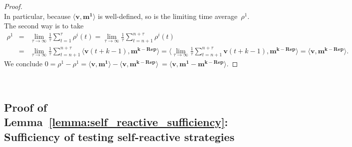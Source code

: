 \documentclass[9pt,twoside,lineno]{pnas-new}
\theoremstyle{plainCl1}
\theoremstyle{plainCl2}
\begin{document}
\begin{proof}
\begin{equation*}
\end{equation*}
In particular, because $\big\langle \mathbf{v},\mathbf{m^1} \big\rangle$ is well-defined, so is the limiting time average~$\rho^1$. The second way is to take
\begin{equation*}
\begin{array}{rcl}
\rho^1 &= &\displaystyle 
\lim_{\tau \to \infty} \frac{1}{\tau} \sum_{t=1}^\tau \rho^i(t) 
= \lim_{\tau \to \infty} \frac{1}{\tau} \sum_{t=n+1}^{n+\tau} \rho^i(t)\\[0.5cm]
&= &\displaystyle 
\lim_{\tau \to \infty} \frac{1}{\tau} \sum_{t=n+1}^{n+\tau}  \big\langle \mathbf{v}(t\!+\!k\!-\!1) ,  \mathbf{m^{k-\text{Rep}}}\big\rangle 
=  \big\langle  \lim_{\tau \to \infty} \frac{1}{\tau} \sum_{t=n+1}^{n+\tau} \mathbf{v}(t\!+\!k\!-\!1) ,  \mathbf{m^{k-\text{Rep}}}\big\rangle
= \big\langle \mathbf{v},  \mathbf{m^{k-\text{Rep}}} \big\rangle.
\end{array}
\end{equation*}
We conclude
$
0 = \rho^1 \!-\! \rho^1 = \big\langle \mathbf{v},\mathbf{m^1} \big\rangle\!-\!\big\langle \mathbf{v},  \mathbf{m^{k-\text{Rep}}} \big\rangle\ = \big\langle \mathbf{v}, \mathbf{m^1}\!-\!\mathbf{m^{k-\text{Rep}}} \big\rangle.
$
\end{proof}
~




\subsection{Proof of Lemma~\ref{lemma:self_reactive_sufficiency}: Sufficiency of testing self-reactive strategies}
\end{document}
